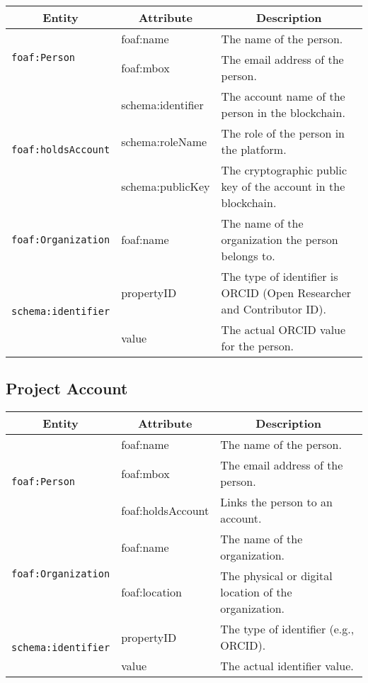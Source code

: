 \documentclass{article}
\begin{document}
\begin{longtable}{|l|l|p{8cm}|}
    \hline
    \multicolumn{1}{|c|}{\textbf{Entity}} & 
    \multicolumn{1}{c|}{\textbf{Attribute}} & 
    \multicolumn{1}{c|}{\textbf{Description}} \\
    \hline
    \multirow{2}{*}{\texttt{foaf:Person}}  
        & foaf:name & The name of the person. \\ \cline{2-3}
        & foaf:mbox & The email address of the person. \\ \cline{2-3} 
    \hline
    \multirow{3}{*}{\texttt{foaf:holdsAccount}}  
        & schema:identifier & The account name of the person in the blockchain. \\ \cline{2-3}
        & schema:roleName & The role of the person in the platform. \\ \cline{2-3}
        & schema:publicKey & The cryptographic public key of the account in the blockchain. \\ 
    \hline
    \multirow{1}{*}{\texttt{foaf:Organization}}  
        & foaf:name & The name of the organization the person belongs to. \\ \cline{1-3}
         
    \hline
    \multirow{2}{*}{\texttt{schema:identifier}}  
        & propertyID & The type of identifier is ORCID (Open Researcher and Contributor ID). \\ \cline{2-3}
        & value & The actual ORCID value for the person. \\ 
    \hline
    \end{longtable}
    
\subsection{Project Account}

\begin{longtable}{|l|l|p{8cm}|}
    \hline
    \multicolumn{1}{|c|}{\textbf{Entity}} & 
    \multicolumn{1}{c|}{\textbf{Attribute}} & 
    \multicolumn{1}{c|}{\textbf{Description}} \\
    \hline
    \multirow{3}{*}{\texttt{foaf:Person}}  
        & foaf:name & The name of the person. \\ \cline{2-3}
        & foaf:mbox & The email address of the person. \\ \cline{2-3}
        & foaf:holdsAccount & Links the person to an account. \\ 
    \hline
    \multirow{2}{*}{\texttt{foaf:Organization}}  
        & foaf:name & The name of the organization. \\ \cline{2-3}
        & foaf:location & The physical or digital location of the organization. \\ 
    \hline
    \multirow{2}{*}{\texttt{schema:identifier}}  
        & propertyID & The type of identifier (e.g., ORCID). \\ \cline{2-3}
        & value & The actual identifier value. \\ 
    \hline
    \end{longtable}
\end{document}
